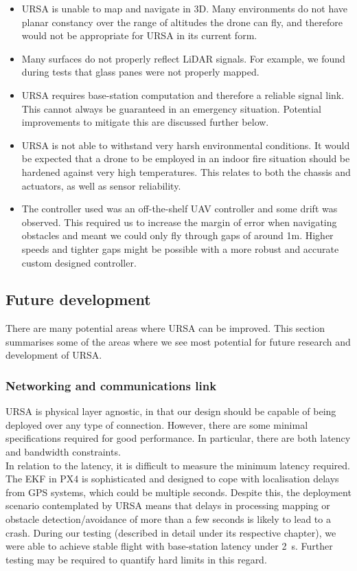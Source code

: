 \documentclass[capstone_report.tex]{subfiles}
\begin{document}
\begin{itemize}
\item URSA is unable to map and navigate in 3D. Many environments do not have planar constancy over the range of altitudes the drone can fly, and therefore would not be appropriate for URSA in its current form.
\item Many surfaces do not properly reflect LiDAR signals. For example, we found during tests that glass panes were not properly mapped.
\item URSA requires base-station computation and therefore a reliable signal link. This cannot always be guaranteed in an emergency situation. Potential improvements to mitigate this are discussed further below.
\item URSA is not able to withstand very harsh environmental conditions. It would be expected that a drone to be employed in an indoor fire situation should be hardened against very high temperatures. This relates to both the chassis and actuators, as well as sensor reliability.
\item The controller used was an off-the-shelf UAV controller and some drift was observed. This required us to increase the margin of error when navigating obstacles and meant we could only fly through gaps of around 1m. Higher speeds and tighter gaps might be possible with a more robust and accurate custom designed controller.
\end{itemize}

\subsection{Future development}
There are many potential areas where URSA can be improved. This section summarises some of the areas where we see most potential for future research and development of URSA.

\subsubsection{Networking and communications link}
URSA is physical layer agnostic, in that our design should be capable of being deployed over any type of connection. However, there are some minimal specifications required for good performance. In particular, there are both latency and bandwidth constraints.\\ 

In relation to the latency, it is difficult to measure the minimum latency required. The EKF in PX4 is sophisticated and designed to cope with localisation delays from GPS systems, which could be multiple seconds. Despite this, the deployment scenario contemplated by URSA means that delays in processing mapping or obstacle detection/avoidance of more than a few seconds is likely to lead to a crash. During our testing (described in detail under its respective chapter), we were able to achieve stable flight with base-station latency under \SI{2}{\second}. Further testing may be required to quantify hard limits in this regard.\\
\end{document}
